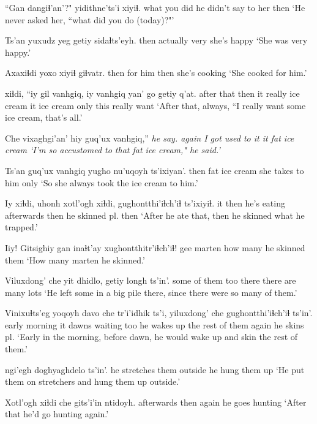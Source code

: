 \documentclass[12pt]{article}
\begin{document}
\gll ``Gan dangiɬ'an'?" {yidithne'ts'i} xiyiɬ. 
what {you did} {he didn't say to her} then
\glt `He never asked her, ``what did you do (today)?"'
\glend

\gll Ts'an {yuxudz yeg} getiy sidaɬts'eyh. 
then actually  very {she's happy}
\glt `She was very happy.'
\glend

\gll Axaxiɬdi yoxo xiyiɬ giɬvatr. 
then {for him} then {she's cooking}
\glt `She cooked for him.'
\glend

 xiɬdi, ``iy gil vanhgiq, iy vanhgiq yan' go getiy q'at. 
{after that} then it really {ice cream} it {ice cream} only this really {want}
\glt `After that, always, ``I really want some ice cream, that's all.'
\glend

\gll Che vixaghgi'an' hiy guq'ux vanhgiq,'' \em{he say}.
again {I got used to it} it {fat} {ice cream} 
\glt `I'm so accustomed to that fat ice cream," he said.'
\glend

\gll Ts'an guq'ux vanhgiq {yugho nu'uqoyh} ts'ixiyan'. 
then fat {ice cream} {she takes to him} only
\glt `So she always took the ice cream to him.'
\glend

\gll Iy xiɬdi, uhonh xotl'ogh xiɬdi, gughontthi'iɬch'iɬ ts'ixiyiɬ. 
it then {he's eating} afterwards then {he skinned pl.} then
\glt `After he ate that, then he skinned what he trapped.'
\glend

\gll Iiy! Gitsighiy {gan inaɬt'ay} xughontthitr'iɬch'iɬ! 
gee marten {how many} {he skinned them} 
\glt `How many marten he skinned.'
\glend

\gll Viluxdong' che yit dhidlo, getiy longh ts'in'.
{some of them} too there {there are} many lots {}
\glt `He left some in a big pile there, since there were so many of them.'
\glend

\gll Vinixuɬts'eg yoqoyh davo che tr'i'idhik ts'i, yiluxdong' che gughontthi'iɬch'iɬ ts'in'. 
{early morning} {it dawns} waiting too {he wakes up} {} {the rest of them} again {he skins pl.}
\glt `Early in the morning, before dawn, he would wake up and skin the rest of them.'
\glend

 ngi'egh {doghyaghdelo} ts'in'.
{he stretches them} outside {he hung them up} {}
\glt `He put them on stretchers and hung them up outside.'
\glend

\gll Xotl'ogh xiɬdi che {gits'i'in ntidoyh.} 
{afterwards} then again {he goes hunting}
\glt `After that he'd go hunting again.'
\glend
\end{document}
